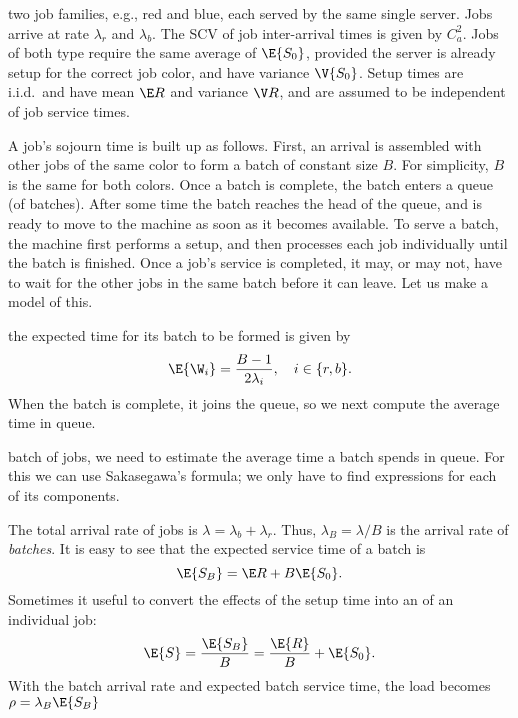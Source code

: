  two job families, e.g., red and blue, each served by the same single server.
Jobs arrive at rate $\lambda_r$ and $\lambda_b$. The SCV of job inter-arrival times is given by $C_a^2$.
Jobs of both type require the same average  of $\E{S_0}$, provided the server is already setup for the correct job color, and have variance $\V{S_0}$.
Setup times are i.i.d.\ and  have mean $\E R$ and  variance $\V R$, and are assumed to be independent of job service times.


A job's sojourn time is built up as follows.
First, an arrival is assembled with other jobs of the same color to form a batch of constant size $B$.
For simplicity, $B$ is the same for both colors.
Once a batch is complete, the batch enters a queue (of batches).
After some time the batch reaches the head of the queue, and is ready to move to the machine as soon as it becomes available.
To serve a batch, the machine first performs a setup, and then processes each job individually until the batch is finished.
Once a job's service is completed, it may, or may not, have to wait for the other jobs in the same batch before it can leave.
Let us make a model of this.


 the expected time for its batch to be formed is given by
\begin{equation}\label{eq:79}
 \E{\W_i} = \frac{B-1}{2\lambda_i}, \quad i\in \{r, b\}.
\end{equation}
When the batch is complete, it joins the queue, so we next compute the average time in queue.

 batch of jobs, we need to estimate the average time a batch spends in queue.
For this we can use Sakasegawa's formula;  we only have to find expressions for each of its components.

The total arrival rate of jobs is $\lambda= \lambda_b+\lambda_r$. Thus, $\lambda_B=\lambda/B$ is the arrival rate of \emph{batches}.
It is easy to see that the expected service time of a batch is
\begin{equation}\label{eq:90}
\E{S_B} = \E R + B\E{S_0}.
\end{equation}
Sometimes it useful to convert the effects of the  setup time into an  of an individual job:
\begin{equation}\label{eq:60}
  \E{S} = \frac{\E{S_B}}{B} = \frac{\E{R}} B +  \E{S_0}.
 \end{equation}
With the batch arrival rate and expected batch service time, the load becomes  $\rho = \lambda_B \E{S_B}$

